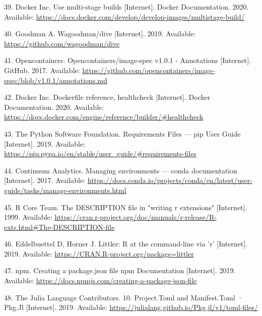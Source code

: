 \documentclass[10pt,letterpaper]{article}
\begin{document}
\leavevmode\hypertarget{ref-docker_multi-stage_2020}{}%
39. Docker Inc. Use multi-stage builds {[}Internet{]}. Docker
Documentation. 2020. Available:
\url{https://docs.docker.com/develop/develop-images/multistage-build/}

\leavevmode\hypertarget{ref-goodman_dive_2019}{}%
40. Goodman A. Wagoodman/dive {[}Internet{]}. 2019. Available:
\url{https://github.com/wagoodman/dive}

\leavevmode\hypertarget{ref-opencontainers_image-spec_2017}{}%
41. Opencontainers. Opencontainers/image-spec v1.0.1 - Annotations
{[}Internet{]}. GitHub. 2017. Available:
\url{https://github.com/opencontainers/image-spec/blob/v1.0.1/annotations.md}

\leavevmode\hypertarget{ref-docker_healthcheck_2020}{}%
42. Docker Inc. Dockerfile reference, healthcheck {[}Internet{]}. Docker
Documentation. 2020. Available:
\url{https://docs.docker.com/engine/reference/builder/\#healthcheck}

\leavevmode\hypertarget{ref-the_python_software_foundation_requirements_2019}{}%
43. The Python Software Foundation. Requirements Files --- pip User
Guide {[}Internet{]}. 2019. Available:
\url{https://pip.pypa.io/en/stable/user_guide/\#requirements-files}

\leavevmode\hypertarget{ref-continuum_analytics_managing_2017}{}%
44. Continuum Analytics. Managing environments --- conda documentation
{[}Internet{]}. 2017. Available:
\url{https://docs.conda.io/projects/conda/en/latest/user-guide/tasks/manage-environments.html}

\leavevmode\hypertarget{ref-r_core_team_description_1999}{}%
45. R Core Team. The DESCRIPTION file in "writing r extensions"
{[}Internet{]}. 1999. Available:
\url{https://cran.r-project.org/doc/manuals/r-release/R-exts.html\#The-DESCRIPTION-file}

\leavevmode\hypertarget{ref-eddelbuettel_littler_2019}{}%
46. Eddelbuettel D, Horner J. Littler: R at the command-line via 'r'
{[}Internet{]}. 2019. Available:
\url{https://CRAN.R-project.org/package=littler}

\leavevmode\hypertarget{ref-npm_creating_2019}{}%
47. npm. Creating a package.json file npm Documentation {[}Internet{]}.
2019. Available:
\url{https://docs.npmjs.com/creating-a-package-json-file}

\leavevmode\hypertarget{ref-julia_tomls_2019}{}%
48. The Julia Language Contributors. 10. Project.Toml and Manifest.Toml
· Pkg.Jl {[}Internet{]}. 2019. Available:
\url{https://julialang.github.io/Pkg.jl/v1/toml-files/}
\end{document}
